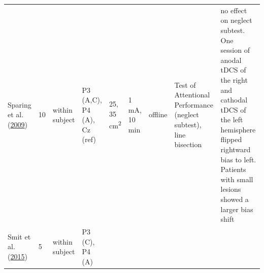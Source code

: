 \documentclass[11pt,]{memoir}
\begin{document}
\begin{longtable}[]{@{}lllllllll@{}}
\begin{minipage}[t]{0.09\columnwidth}
Sparing et al. (\protect\hyperlink{ref-Sparing2009}{2009})\strut
\end{minipage} & \begin{minipage}[t]{0.02\columnwidth}\raggedright
10\strut
\end{minipage} & \begin{minipage}[t]{0.04\columnwidth}\raggedright
within
subject\strut
\end{minipage} & \begin{minipage}[t]{0.10\columnwidth}\raggedright
P3 (A,C), P4 (A), Cz
(ref)\strut
\end{minipage} & \begin{minipage}[t]{0.03\columnwidth}\raggedright
25,
35
cm\textsuperscript{2}\strut
\end{minipage} & \begin{minipage}[t]{0.05\columnwidth}\raggedright
1 mA, 10
min\strut
\end{minipage} & \begin{minipage}[t]{0.04\columnwidth}\raggedright
offline\strut
\end{minipage} & \begin{minipage}[t]{0.15\columnwidth}\raggedright
Test of Attentional Performance
(neglect subtest), line bisection\strut
\end{minipage} & \begin{minipage}[t]{0.24\columnwidth}\raggedright
no effect on neglect subtest. One session of anodal tDCS of
the right and cathodal tDCS of the left hemisphere flipped
rightward bias to left. Patients with small lesions showed a
larger bias shift\strut
\end{minipage}\tabularnewline
\begin{minipage}[t]{0.09\columnwidth}\raggedright
Smit et al. (\protect\hyperlink{ref-Smit2015}{2015})\strut
\end{minipage} & \begin{minipage}[t]{0.02\columnwidth}\raggedright
5\strut
\end{minipage} & \begin{minipage}[t]{0.04\columnwidth}\raggedright
within
subject\strut
\end{minipage} & \begin{minipage}[t]{0.10\columnwidth}\raggedright
P3 (C), P4 (A)\strut
\end{minipage} & \begin{minipage}[t]{0.03\columnwidth}\raggedright
\strut
\end{minipage} & \begin{minipage}[t]{0.05\columnwidth}\raggedright

\end{minipage}
\end{longtable}
\end{document}
